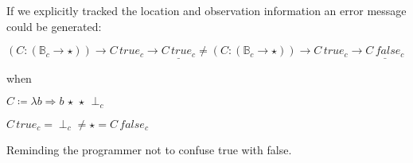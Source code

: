 If we explicitly tracked the location and observation information an error message could be generated:
 
$\left(C:\left(\mathbb{B}_{c}\rightarrow\star\right)\right)\rightarrow C\,true_{c}\rightarrow\underline{C\,true_{c}}
\neq
\left(C:\left(\mathbb{B}_{c}\rightarrow\star\right)\right) \rightarrow C\,true_{c}\rightarrow\underline{C\,false_{c}}$
 
when
 
$C\coloneqq\lambda b \Rightarrow b\,\star\,\star\,\perp_c$
 
$C\, true_c = \perp_c \neq \star = C\, false_c$
 
Reminding the programmer not to confuse true with false.